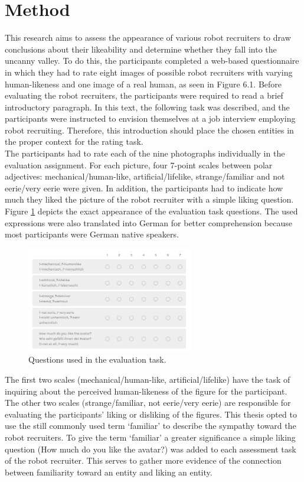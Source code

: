 \section{Method}
This research aims to assess the appearance of various robot recruiters to draw conclusions about their likeability and determine whether they fall into the uncanny valley. To do this, the participants completed a web-based questionnaire in which they had to rate eight images of possible robot recruiters with varying human-likeness and one image of a real human, as seen in Figure 6.1. Before evaluating the robot recruiters, the participants were required to read a brief introductory paragraph. In this text, the following task was described, and the participants were instructed to envision themselves at a job interview employing robot recruiting. Therefore, this introduction should place the chosen entities in the proper context for the rating task. \\
The participants had to rate each of the nine photographs individually in the evaluation assignment. For each picture, four 7-point scales between polar adjectives: mechanical/human-like, artificial/lifelike, strange/familiar and not eerie/very eerie were given. In addition, the participants had to indicate how much they liked the picture of the robot recruiter with a simple liking question. Figure \ref{fig:evaluation_task} depicts the exact appearance of the evaluation task questions. The used expressions were also translated into German for better comprehension because most participants were German native speakers.
\begin{figure} %
    \centering
    \includegraphics[width=0.65\textwidth]{graphics/evaluation_task.png}
    \caption{Questions used in the evaluation task.}
    \label{fig:evaluation_task}
\end{figure}
The first two scales (mechanical/human-like, artificial/lifelike)  have the task of inquiring about the perceived human-likeness of the figure for the participant. The other two scales (strange/familiar, not eerie/very eerie) are responsible for evaluating the participants' liking or disliking of the figures. This thesis opted to use the still commonly used term `familiar' to describe the sympathy toward the robot recruiters. To give the term `familiar' a greater significance a simple liking question (How much do you like the avatar?) was added to each assessment task of the robot recruiter. This serves to gather more evidence of the connection between familiarity toward an entity and liking an entity.\\
